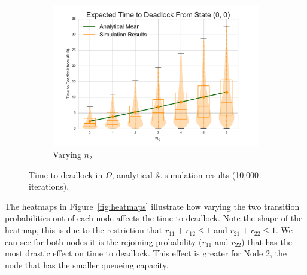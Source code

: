 \documentclass{article}
\begin{document}
\begin{figure}[!htbp]
\begin{subfigure}[b]{0.5\textwidth}
  \includegraphics[width=\textwidth]{images/vary_n2fb}
  \caption{Varying $n_2$}
  \label{fig:timestodeadlockfb_n2}
\end{subfigure}
\caption{Time to deadlock in $\Omega$, analytical \& simulation results (10,000 iterations).}
\label{fig:timestodeadlockfeedback}
\end{figure}

The heatmaps in Figure~\ref{fig:heatmaps} illustrate how varying the two transition probabilities out of each node affects the time to deadlock.
Note the shape of the heatmap, this is due to the restriction that $r_{11} + r_{12} \leq 1$ and $r_{21} + r_{22} \leq 1$.
We can see for both nodes it is the rejoining probability ($r_{11}$ and $r_{22}$) that has the most drastic effect on time to deadlock.
This effect is greater for Node 2, the node that has the smaller queueing capacity.
\end{document}
